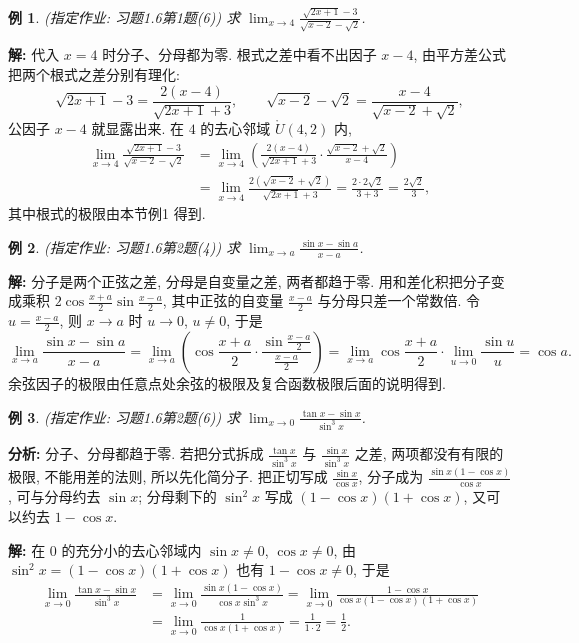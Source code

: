 \documentclass[UTF8,openany]{ctexbook}
\theoremstyle{chinesetextbook}
\newtheorem{example}{例}[section]
\newenvironment{cnsolution}{\par\indent\textbf{解:} \ignorespaces}{\par}
\begin{document}
\begin{example}
\textnormal{(指定作业: 习题1.6第1题(6))} 求 $\displaystyle\lim_{x\to4}\frac{\sqrt{2x+1}-3}{\sqrt{x-2}-\sqrt2}$.
\end{example}
\begin{cnsolution}
代入 $x=4$ 时分子、分母都为零. 根式之差中看不出因子 $x-4$, 由平方差公式把两个根式之差分别有理化:
\[
\sqrt{2x+1}-3=\frac{2(x-4)}{\sqrt{2x+1}+3},\qquad\sqrt{x-2}-\sqrt2=\frac{x-4}{\sqrt{x-2}+\sqrt2},
\]
公因子 $x-4$ 就显露出来. 在 $4$ 的去心邻域 $\mathring U(4,2)$ 内,
\[
\begin{aligned}
\lim_{x\to4}\frac{\sqrt{2x+1}-3}{\sqrt{x-2}-\sqrt2}
&=\lim_{x\to4}\left(\frac{2(x-4)}{\sqrt{2x+1}+3}\cdot\frac{\sqrt{x-2}+\sqrt2}{x-4}\right)\\
&=\lim_{x\to4}\frac{2\left(\sqrt{x-2}+\sqrt2\right)}{\sqrt{2x+1}+3}=\frac{2\cdot2\sqrt2}{3+3}=\frac{2\sqrt2}3,
\end{aligned}
\]
其中根式的极限由本节例1 得到.
\end{cnsolution}
\begin{example}
\textnormal{(指定作业: 习题1.6第2题(4))} 求 $\displaystyle\lim_{x\to a}\frac{\sin x-\sin a}{x-a}$.
\end{example}
\begin{cnsolution}
分子是两个正弦之差, 分母是自变量之差, 两者都趋于零. 用和差化积把分子变成乘积 $\displaystyle2\cos\frac{x+a}2\sin\frac{x-a}2$, 其中正弦的自变量 $\displaystyle\frac{x-a}2$ 与分母只差一个常数倍. 令 $\displaystyle u=\frac{x-a}2$, 则 $x\to a$ 时 $u\to0$, $u\ne0$, 于是
\[
\lim_{x\to a}\frac{\sin x-\sin a}{x-a}=\lim_{x\to a}\left(\cos\frac{x+a}2\cdot\frac{\sin\frac{x-a}2}{\frac{x-a}2}\right)=\lim_{x\to a}\cos\frac{x+a}2\cdot\lim_{u\to0}\frac{\sin u}u=\cos a.
\]
余弦因子的极限由任意点处余弦的极限及复合函数极限后面的说明得到.
\end{cnsolution}
\begin{example}
\textnormal{(指定作业: 习题1.6第2题(6))} 求 $\displaystyle\lim_{x\to0}\frac{\tan x-\sin x}{\sin^3x}$.
\end{example}
\par\indent\textbf{分析:} 分子、分母都趋于零. 若把分式拆成 $\displaystyle\frac{\tan x}{\sin^3x}$ 与 $\displaystyle\frac{\sin x}{\sin^3x}$ 之差, 两项都没有有限的极限, 不能用差的法则, 所以先化简分子. 把正切写成 $\displaystyle\frac{\sin x}{\cos x}$, 分子成为 $\displaystyle\frac{\sin x(1-\cos x)}{\cos x}$, 可与分母约去 $\sin x$; 分母剩下的 $\sin^2x$ 写成 $(1-\cos x)(1+\cos x)$, 又可以约去 $1-\cos x$.
\begin{cnsolution}
在 $0$ 的充分小的去心邻域内 $\sin x\ne0$, $\cos x\ne0$, 由 $\sin^2x=(1-\cos x)(1+\cos x)$ 也有 $1-\cos x\ne0$, 于是
\[
\begin{aligned}
\lim_{x\to0}\frac{\tan x-\sin x}{\sin^3x}
&=\lim_{x\to0}\frac{\sin x(1-\cos x)}{\cos x\sin^3x}=\lim_{x\to0}\frac{1-\cos x}{\cos x(1-\cos x)(1+\cos x)}\\
&=\lim_{x\to0}\frac1{\cos x(1+\cos x)}=\frac1{1\cdot2}=\frac12.
\end{aligned}
\]
\end{cnsolution}
\end{document}
